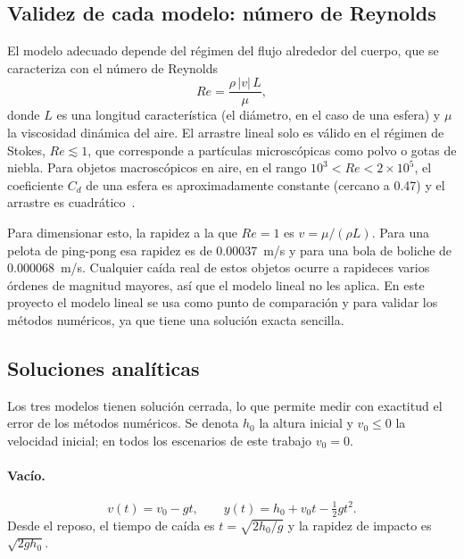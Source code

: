 \subsection{Validez de cada modelo: número de Reynolds}

El modelo adecuado depende del régimen del flujo alrededor del cuerpo, que se caracteriza con el número de Reynolds
\begin{equation}
  Re = \frac{\rho\, \lvert v\rvert\, L}{\mu},
  \label{eq:reynolds}
\end{equation}
donde $L$ es una longitud característica (el diámetro, en el caso de una esfera) y $\mu$ la viscosidad dinámica del aire. El arrastre lineal solo es válido en el régimen de Stokes, $Re \lesssim 1$, que corresponde a partículas microscópicas como polvo o gotas de niebla. Para objetos macroscópicos en aire, en el rango $10^3 < Re < 2\times10^5$, el coeficiente $C_d$ de una esfera es aproximadamente constante (cercano a 0.47) y el arrastre es cuadrático~\cite{white}.

Para dimensionar esto, la rapidez a la que $Re = 1$ es $v = \mu/(\rho L)$. Para una pelota de ping-pong esa rapidez es de \qty{0.00037}{m/s} y para una bola de boliche de \qty{0.000068}{m/s}. Cualquier caída real de estos objetos ocurre a rapideces varios órdenes de magnitud mayores, así que el modelo lineal no les aplica. En este proyecto el modelo lineal se usa como punto de comparación y para validar los métodos numéricos, ya que tiene una solución exacta sencilla.

\subsection{Soluciones analíticas}
\label{sec:analiticas}

Los tres modelos tienen solución cerrada, lo que permite medir con exactitud el error de los métodos numéricos. Se denota $h_0$ la altura inicial y $v_0 \le 0$ la velocidad inicial; en todos los escenarios de este trabajo $v_0 = 0$.

\paragraph{Vacío.}
\begin{equation}
  v(t) = v_0 - g t, \qquad y(t) = h_0 + v_0 t - \tfrac12 g t^2 .
\end{equation}
Desde el reposo, el tiempo de caída es $t = \sqrt{2h_0/g}$ y la rapidez de impacto es $\sqrt{2gh_0}$.

